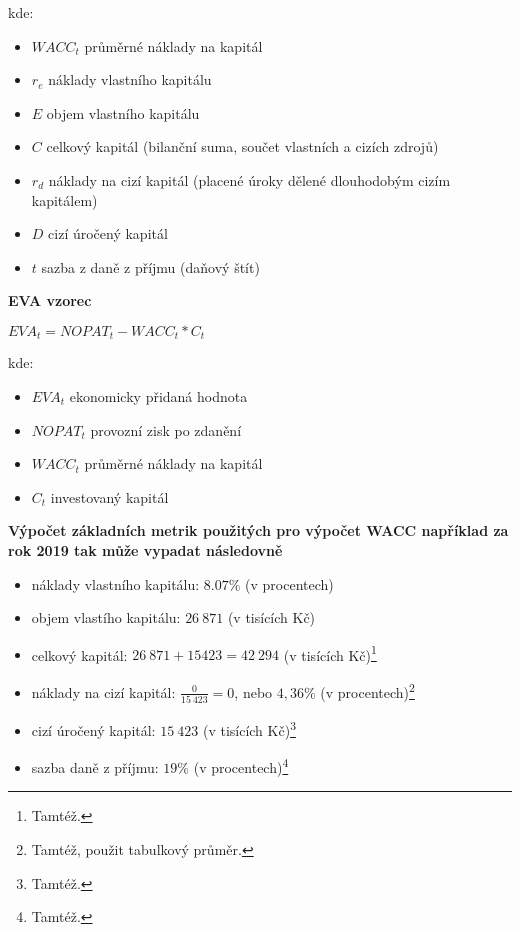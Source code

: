 kde:\\

\begin{itemize}
	\item $WACC_t$ průměrné náklady na kapitál
	\item $r_e$ náklady vlastního kapitálu
	\item $E$ objem vlastního kapitálu
	\item $C$ celkový kapitál (bilanční suma, součet vlastních a cizích zdrojů)
	\item $r_d$ náklady na cizí kapitál (placené úroky dělené dlouhodobým cizím kapitálem)
	\item $D$ cizí úročený kapitál
	\item $t$ sazba z daně z příjmu (daňový štít)
\end{itemize}

\noindent\textbf{EVA vzorec}\\

\begin{center}
$EVA_t = NOPAT_t - WACC_t * C_t$\\
\end{center}

kde:\\

\begin{itemize}
	\item $EVA_t$ ekonomicky přidaná hodnota
	\item $NOPAT_t$ provozní zisk po zdanění
	\item $WACC_t$ průměrné náklady na kapitál
	\item $C_t$ investovaný kapitál
\end{itemize}

\newpage


\noindent\textbf{Výpočet základních metrik použitých pro výpočet WACC například za rok 2019 tak může vypadat následovně}

\begin{itemize}
	\item náklady vlastního kapitálu: $8.07\%$ (v procentech)%
	\item objem vlastího kapitálu: $26\ 871$ (v tisících Kč)
	\item celkový kapitál: $26\ 871 + 15 423 = 42\ 294$ (v tisících Kč)\footnote{Tamtéž.}
	\item náklady na cizí kapitál: $\frac{0}{15\ 423} = 0$, nebo $4,36\%$ (v procentech)\footnote{Tamtéž, použit tabulkový průměr.}
	\item cizí úročený kapitál: $15\ 423$ (v tisících Kč)\footnote{Tamtéž.}
	\item sazba daně z příjmu: $19\%$ (v procentech)\footnote{Tamtéž.}
\end{itemize}


